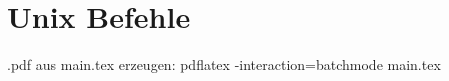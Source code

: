 
\chapter{Unix Befehle}

.pdf aus main.tex erzeugen: \quad pdflatex -interaction=batchmode main.tex\\